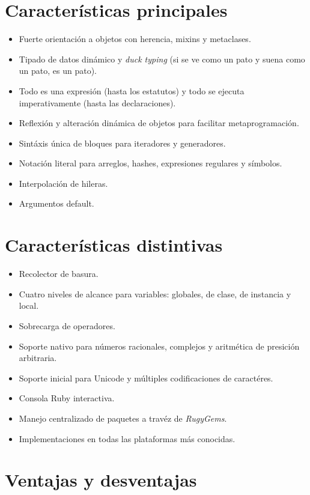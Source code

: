 \documentclass{IEEEtran}
\begin{document}
\section{Caracter\'isticas principales}
\begin{itemize}
  \item Fuerte orientaci\'on a objetos con herencia, mixins y metaclases.
  \item Tipado de datos din\'amico y \emph{duck typing} (si se ve como un pato y suena como un pato, es un pato).
  \item Todo es una expresi\'on (hasta los estatutos) y todo se ejecuta imperativamente (hasta las declaraciones).
  \item Reflexi\'on y alteraci\'on din\'amica de objetos para facilitar metaprogramaci\'on.
  \item Sint\'axis \'unica de bloques para iteradores y generadores.
  \item Notaci\'on literal para arreglos, hashes, expresiones regulares y s\'imbolos.
  \item Interpolaci\'on de hileras.
  \item Argumentos default.
\end{itemize}

\section{Caracter\'isticas distintivas}
\begin{itemize}
  \item Recolector de basura.
  \item Cuatro niveles de alcance para variables: globales, de clase, de instancia y local.
  \item Sobrecarga de operadores.
  \item Soporte nativo para n\'umeros racionales, complejos y aritm\'etica de presici\'on arbitraria.
  \item Soporte inicial para Unicode y m\'ultiples codificaciones de caract\'eres.
  \item Consola Ruby interactiva.
  \item Manejo centralizado de paquetes a trav\'ez de \emph{RugyGems}.
  \item Implementaciones en todas las plataformas m\'as conocidas.
\end{itemize}

\section{Ventajas y desventajas}
\end{document}
